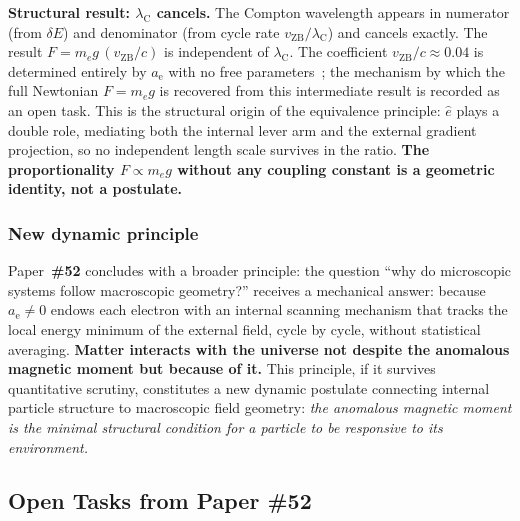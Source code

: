 \documentclass[12pt,letterpaper]{article}
\newcommand{\paperno}[1]{\textbf{\#{}#1}}
\newcommand{\vZB}{v_{\mathrm{ZB}}}
\newcommand{\lambdaC}{\lambda_{\mathrm{C}}}
\newcommand{\anom}{a_{\mathrm{e}}}
\begin{document}
\begin{mdframed}[style=orangebox]
\textbf{Structural result: $\lambdaC$ cancels.} The Compton wavelength appears in numerator (from $\delta E$) and denominator (from cycle rate $\vZB/\lambdaC$) and cancels exactly. The result $F = m_e g\,(\vZB/c)$ is independent of $\lambdaC$. The coefficient $\vZB/c\approx 0.04$ is determined entirely by $\anom$ with no free parameters~\cite{hanamura10}; the mechanism by which the full Newtonian $F = m_e g$ is recovered from this intermediate result is recorded as an open task. This is the structural origin of the equivalence principle: $\hat{e}$ plays a double role, mediating both the internal lever arm and the external gradient projection, so no independent length scale survives in the ratio. \textbf{The proportionality $F\propto m_e g$ without any coupling constant is a geometric identity, not a postulate.}
\end{mdframed}

\subsubsection{New dynamic principle}

Paper~\paperno{52} concludes with a broader principle: the question ``why do microscopic systems follow macroscopic geometry?'' receives a mechanical answer: because $\anom \neq 0$ endows each electron with an internal scanning mechanism that tracks the local energy minimum of the external field, cycle by cycle, without statistical averaging. \textbf{Matter interacts with the universe not despite the anomalous magnetic moment but because of it.} This principle, if it survives quantitative scrutiny, constitutes a new dynamic postulate connecting internal particle structure to macroscopic field geometry: \emph{the anomalous magnetic moment is the minimal structural condition for a particle to be responsive to its environment.}

\subsection{Open Tasks from Paper \#52}
\label{subsec:p52_open}
\end{document}
